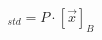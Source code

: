 \documentclass[preview]{standalone}
\begin{document}
\begin{align*}
[\vec{x}]_{std} = P \cdot [\vec{x}]_B
\end{align*}
\end{document}
